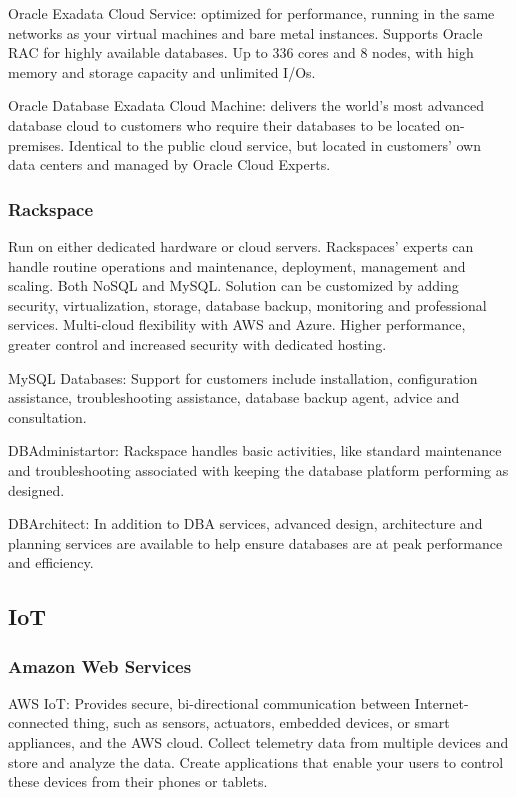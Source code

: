 Oracle Exadata Cloud Service: optimized for performance, running in the same networks as your virtual machines and bare metal instances. Supports Oracle RAC for highly available databases. Up to 336 cores and 8 nodes, with high memory and storage capacity and unlimited I/Os. 

Oracle Database Exadata Cloud Machine: delivers the world's most advanced database cloud to customers who require their databases to be located on-premises. Identical to the public cloud service, but located in customers' own data centers and managed by Oracle Cloud Experts. 

\subsubsection{Rackspace}
Run on either dedicated hardware or cloud servers. Rackspaces' experts can handle routine operations and maintenance, deployment, management and scaling. Both NoSQL and MySQL. Solution can be customized by adding security, virtualization, storage, database backup, monitoring and professional services. Multi-cloud flexibility with AWS and Azure. Higher performance, greater control and increased security with dedicated hosting.  

MySQL Databases: Support for customers include installation, configuration assistance, troubleshooting assistance, database backup agent, advice and consultation. 

DBAdministartor: Rackspace handles basic activities, like standard maintenance and troubleshooting associated with keeping the database platform performing as designed.

DBArchitect: In addition to DBA services, advanced design, architecture and planning services are available to help ensure databases are at peak performance and efficiency. 


\subsection{IoT}

\subsubsection{Amazon Web Services}
AWS IoT: Provides secure, bi-directional communication between Internet-connected thing, such as sensors, actuators, embedded devices, or smart appliances, and the AWS cloud. Collect telemetry data from multiple devices and store and analyze the data. Create applications that enable your users to control these devices from their phones or tablets. 


